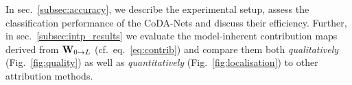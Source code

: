 
In sec.~\ref{subsec:accuracy}, we describe the experimental setup, assess the classification performance of the CoDA-Nets and discuss their efficiency.
Further, in sec.~\ref{subsec:intp_results} we evaluate the model-inherent contribution maps derived from $\mat w_{0\rightarrow L}$ (cf.~eq.~\eqref{eq:contrib}) and compare them both \emph{qualitatively} (Fig.~\ref{fig:quality}) as well as \emph{quantitatively} (Fig.~\ref{fig:localisation}) to other attribution methods.
